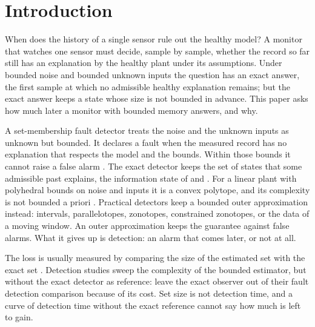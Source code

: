 \section{Introduction}

When does the history of a single sensor rule out the healthy model? A monitor that watches one sensor must decide,
sample by sample, whether the record so far still has an explanation by the healthy plant under its assumptions.
Under bounded noise and bounded unknown inputs the question has an exact answer, the first sample at which no
admissible healthy explanation remains; but the exact answer keeps a state whose size is not bounded in advance.
This paper asks how much later a monitor with bounded memory answers, and why.

A set-membership fault detector treats the noise and the unknown inputs as unknown but bounded. It declares a fault
when the measured record has no explanation that respects the model and the bounds. Within those bounds it cannot
raise a false alarm \citep{ingimundarson2005,scott2016,puig2010}. The exact detector keeps the set of states that some
admissible past explains, the information state of \citet{witsenhausen1968} and \citet{schweppe1968}. For a linear plant
with polyhedral bounds on noise and inputs it is a convex polytope, and its complexity is not bounded a priori
\citep{sznaier2011,blanchini2012}. Practical detectors keep a bounded outer approximation instead: intervals,
parallelotopes, zonotopes, constrained zonotopes, or the data of a moving window. An outer approximation keeps the
guarantee against false alarms. What it gives up is detection: an alarm that comes later, or not at all.

The loss is usually measured by comparing the size of the estimated set with the exact set
\citetext{\citealp[Sec.~5]{scott2016}; \citealp[Sec.~6]{casini2024}}. Detection studies sweep the complexity of the bounded estimator,
but without the exact detector as reference: \citet[p.~133]{scott2016} leave the exact observer out of their fault
detection comparison because of its cost. Set size is not detection time, and a curve of detection time without the
exact reference cannot say how much is left to gain.

